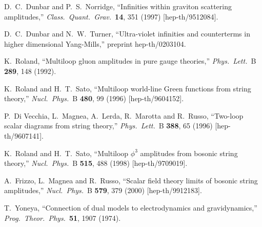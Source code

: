 \documentclass[12pt]{livrev}
\begin{document}
\begin{thebibliography}{99}
D.~C.~Dunbar and P.~S.~Norridge,
``Infinities within graviton scattering amplitudes,''
{\it Class.\ Quant.\ Grav.}\  {\bf 14}, 351 (1997)
[hep-th/9512084].

D.~C.~Dunbar and N.~W.~Turner,
``Ultra-violet infinities and counterterms in higher dimensional Yang-Mills,''
preprint hep-th/0203104.

K.~Roland,
``Multiloop gluon amplitudes in pure gauge theories,''
{\it Phys.\ Lett.}\ B {\bf 289}, 148 (1992).

K.~Roland and H.~T.~Sato,
``Multiloop world-line Green functions from string theory,''
{\it Nucl.\ Phys.}\ B {\bf 480}, 99 (1996)
[hep-th/9604152].

P.~Di Vecchia, L.~Magnea, A.~Lerda, R.~Marotta and R.~Russo,
``Two-loop scalar diagrams from string theory,''
{\it Phys.\ Lett.}\ B {\bf 388}, 65 (1996)
[hep-th/9607141].

K.~Roland and H.~T.~Sato,
``Multiloop $\phi^3$ amplitudes from bosonic string theory,''
{\it Nucl.\ Phys.}\ B {\bf 515}, 488 (1998)
[hep-th/9709019].

A.~Frizzo, L.~Magnea and R.~Russo,
``Scalar field theory limits of bosonic string amplitudes,''
{\it Nucl.\ Phys.}\ B {\bf 579}, 379 (2000)
[hep-th/9912183].

T.~Yoneya,
``Connection of dual models to electrodynamics and gravidynamics,''
{\it Prog.\ Theor.\ Phys.}\  {\bf 51}, 1907 (1974).


\end{thebibliography}
\end{document}
